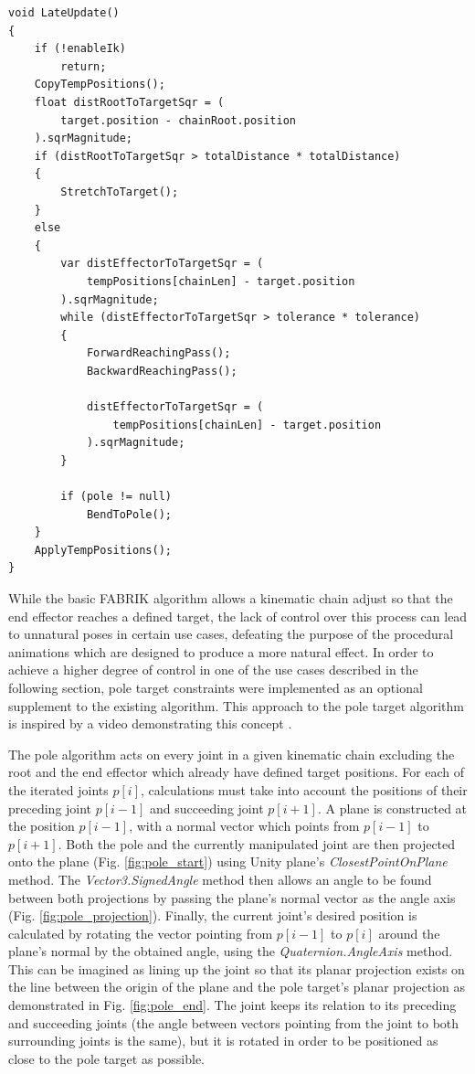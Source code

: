 \begin{lstlisting}[basicstyle=\linespread{0.9}\footnotesize\ttfamily, numbers=none,frame=single,
caption={Full execution of the FABRIK algorithm in each frame.
\textit{Fabrik.cs}},captionpos=t, label=full_loop, language={[Sharp]c}, float=tp]
void LateUpdate()
{
    if (!enableIk)
        return;
    CopyTempPositions();
    float distRootToTargetSqr = (
        target.position - chainRoot.position
    ).sqrMagnitude;
    if (distRootToTargetSqr > totalDistance * totalDistance)
    {
        StretchToTarget();
    }
    else
    {
        var distEffectorToTargetSqr = (
            tempPositions[chainLen] - target.position
        ).sqrMagnitude;
        while (distEffectorToTargetSqr > tolerance * tolerance)
        {
            ForwardReachingPass();
            BackwardReachingPass();

            distEffectorToTargetSqr = (
                tempPositions[chainLen] - target.position
            ).sqrMagnitude;
        }

        if (pole != null)
            BendToPole();
    }
    ApplyTempPositions();
}
\end{lstlisting}

While the basic FABRIK algorithm allows a kinematic chain adjust so that the end
effector reaches a defined target, the lack of control over this process can
lead to unnatural poses in certain use cases, defeating the purpose of the
procedural animations which are designed to produce a more natural effect. In
order to achieve a higher degree of control in one of the use cases described in
the following section, pole target constraints were implemented as an optional
supplement to the existing algorithm. This approach to the pole target algorithm
is inspired by a video demonstrating this concept \cite{youtube_ik}. 

The pole algorithm acts on every joint in a given kinematic chain excluding the
root and the end effector which already have defined target positions. For each
of the iterated joints \(p[i]\), calculations must take into account the
positions of their preceding joint \(p[i-1]\) and succeeding joint \(p[i+1]\).
A plane is constructed at the position \(p[i-1]\), with a normal vector which
points from \(p[i-1]\) to \(p[i+1]\). Both the pole and the currently
manipulated joint are then projected onto the plane (Fig.
\ref{fig:pole_start}) using Unity plane's \textit{ClosestPointOnPlane} method.
The \textit{Vector3.SignedAngle} method then allows an angle to be found between
both projections by passing the plane's normal vector as the angle axis (Fig.
\ref{fig:pole_projection}). Finally, the current joint's desired position is
calculated by rotating the vector pointing from \(p[i-1]\) to \(p[i]\) around
the plane's normal by the obtained angle, using the
\textit{Quaternion.AngleAxis} method. This can be imagined as lining up the
joint so that its planar projection exists on the line between the origin of the
plane and the pole target's planar projection as demonstrated in Fig.
\ref{fig:pole_end}. The joint keeps its relation to its preceding and succeeding
joints (the angle between vectors pointing from the joint to both surrounding
joints is the same), but it is rotated in order to be positioned as close to the
pole target as possible.

